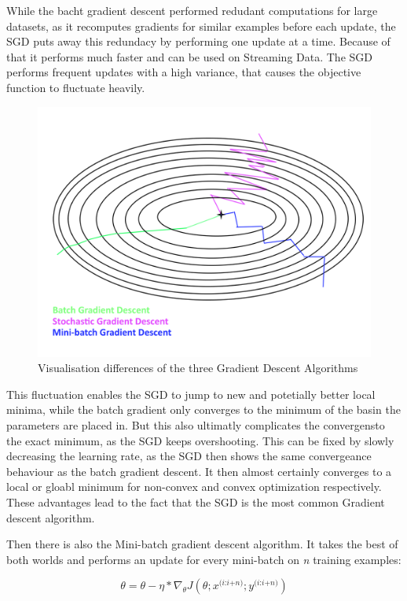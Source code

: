 \documentclass[12pt,oneside,a4paper,parskip]{scrbook}
\begin{document}
While the bacht gradient descent performed redudant computations for large datasets, as it recomputes gradients for similar examples 
before each update, the SGD puts away this redundacy by performing one update at a time. Because of that it performs much faster and 
can be used on Streaming Data.
The SGD performs frequent updates with a high variance, that causes the objective function to fluctuate heavily. 

\begin{figure}
  \centering
  \includegraphics[width=0.7\columnwidth]{Gradient_desc_types}
  \caption{Visualisation differences of the three Gradient Descent Algorithms}
  \label{fig:comp_GD}
\end{figure}

This fluctuation enables the SGD to jump to new and potetially better local minima, while the batch gradient only converges 
to the minimum of the basin the parameters are placed in. But this also ultimatly complicates the convergensto the exact minimum, 
as the SGD keeps overshooting. This can be fixed by slowly decreasing the learning rate, as the SGD then shows the same 
convergeance behaviour as the batch gradient descent. It then almost certainly converges to a local or gloabl minimum for
non-convex and convex optimization respectively. \cite{overvieDiffRSLVQ}
These advantages lead to the fact that the SGD is the most common Gradient descent algorithm.

Then there is also the Mini-batch gradient descent algorithm. It takes the best of both worlds and performs an update for
every mini-batch on \textit{n} training examples:

\begin{equation}
\theta = \theta - \eta * \nabla_\theta \textit{J}(\theta;\textit{x}^\textit{(i:i+n)};\textit{y}^\textit{(i:i+n)})
\end{equation}
\end{document}
